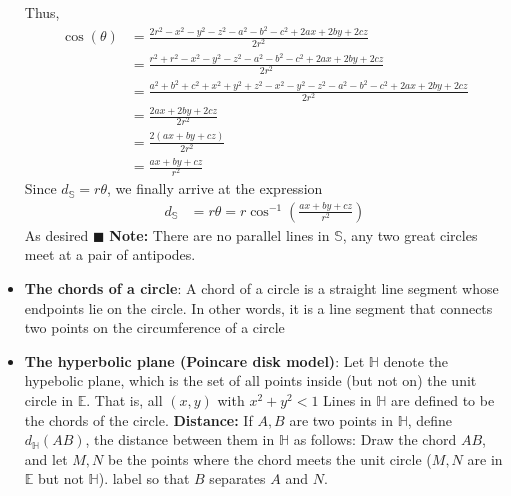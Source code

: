 \documentclass{report}
\begin{document}
\begin{itemize}
            Thus,
            \begin{align*}
                \cos{\left(\theta \right)}  &= \frac{2r^{2} -x^{2}-y^{2}-z^{2}-a^{2}-b^{2}-c^{2}+2ax+2by+2cz}{2r^{2}} \\
                                        &= \frac{r^{2} + r^{2} -x^{2}-y^{2}-z^{2}-a^{2}-b^{2}-c^{2}+2ax+2by+2cz}{2r^{2}} \\
                                        &= \frac{a^{2} + b^{2} + c^{2} + x^{2} + y^{2} + z^{2} -x^{2}-y^{2}-z^{2}-a^{2}-b^{2}-c^{2}+2ax+2by+2cz}{2r^{2}} \\
                                        &= \frac{2ax+2by+2cz}{2r^{2}} \\
                                        &=\frac{2(ax+by+cz)}{2r^{2}} \\
                                        &= \frac{ax+by+cz}{r^{2}}
            \end{align*}
            Since $d_{\mathbb{S}} = r\theta$, we finally arrive at the expression
            \begin{align*}
                d_{\mathbb{S}} &= r\theta  = r\cos^{-1}{\left(\frac{ax+by+cz}{r^{2}}\right)}
            \end{align*}
            As desired \hspace*{\fill} $\blacksquare$
            \bigbreak \noindent 
            \textbf{Note:} There are no parallel lines in $\mathbb{S}$, any two great circles meet at a pair of antipodes.
        \item \textbf{The chords of a circle}: A chord of a circle is a straight line segment whose endpoints lie on the circle. In other words, it is a line segment that connects two points on the circumference of a circle
        \item \textbf{The hyperbolic plane (Poincare disk model)}: Let $\mathbb{H}$ denote the hypebolic plane, which is the set of all points inside (but not on) the unit circle in $\mathbb{E}$. That is, all $(x,y)$ with $x^{2} + y^{2} < 1 $
            \bigbreak \noindent 
            Lines in $\mathbb{H}$ are defined to be the chords of the circle.
            \bigbreak \noindent 
            \textbf{Distance:} If $A,B$ are two points in $\mathbb{H}$, define $d_{\mathbb{H}}(AB)$, the distance between them in $\mathbb{H}$ as follows: Draw the chord $AB$, and let $M,N$ be the points where the chord meets the unit circle ($M,N$ are in $\mathbb{E}$ but not $\mathbb{H}$). label so that $B $ separates $A$ and $N$.
            \bigbreak \noindent 
            \begin{figure}[ht]

\end{figure}
\end{itemize}
\end{document}
